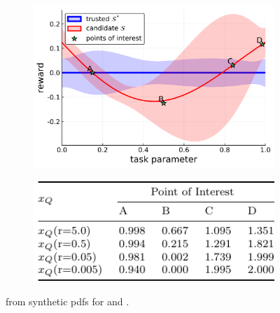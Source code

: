 \begin{figure}[tbp]
    \centering
    \begin{subfigure}[c]{0.5\linewidth}
        \centering
        \includegraphics[width=0.99\linewidth]{Figures/p1.png}
        \vfill
    \end{subfigure}%
    \hfill
    \begin{subfigure}[t]{0.5\linewidth}
        \centering
        \includegraphics[width=0.95\linewidth]{Figures/p1_table.pdf}
    \end{subfigure}
    \caption{\xQ{} from synthetic \pri{} pdfs for \solvetrust{} and \solvecand{}.}
    \label{fig:sq_thry1}
    \vspace{-0.5cm}
\end{figure}

